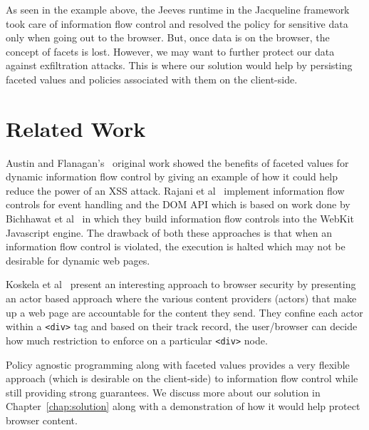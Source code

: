 As seen in the example above, the Jeeves runtime in the Jacqueline framework took
care of information flow control and resolved the policy for sensitive data only
when going out to the browser. But, once data is on the browser, the concept of
facets is lost. However, we may want to further protect our data against exfiltration
attacks. This is where our solution would help by persisting faceted values and
policies associated with them on the client-side.

\section{Related Work}
Austin and Flanagan's~\cite{Faceted} original work showed the benefits of
faceted values for dynamic information flow control by giving an example of how
it could help reduce the power of an XSS attack. Rajani et al~\cite{eventDOMIFC}
implement information flow controls for event handling and the DOM API which is
based on work done by Bichhawat et al~\cite{webkitIFC} in which they build information
flow controls into the WebKit Javascript engine. The drawback of both these approaches
is that when an information flow control is violated, the execution is halted which
may not be desirable for dynamic web pages.

Koskela et al~\cite{SecuringWebContent} present an interesting approach to browser
security by presenting an actor based approach where the various content providers
(actors) that make up a web page are accountable for the content they send. They
confine each actor within a \texttt{<div>} tag and based on their track record,
the user/browser can decide how much restriction to enforce on a particular \texttt{<div>}
node.

Policy agnostic programming along with faceted values provides a very flexible
approach (which is desirable on the client-side) to information flow control while
still providing strong guarantees. We discuss more about our solution
in Chapter~\ref{chap:solution} along with a demonstration of how it would help
protect browser content.
